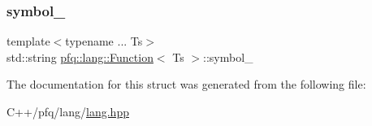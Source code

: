 \subsubsection{\texorpdfstring{symbol\+\_\+}{symbol\_}}
{\footnotesize\ttfamily template$<$typename ... Ts$>$ \\
std\+::string \hyperlink{structpfq_1_1lang_1_1Function}{pfq\+::lang\+::\+Function}$<$ Ts $>$\+::symbol\+\_\+}



The documentation for this struct was generated from the following file\+:\begin{DoxyCompactItemize}
\item 
C++/pfq/lang/\hyperlink{lang_8hpp}{lang.\+hpp}\end{DoxyCompactItemize}

